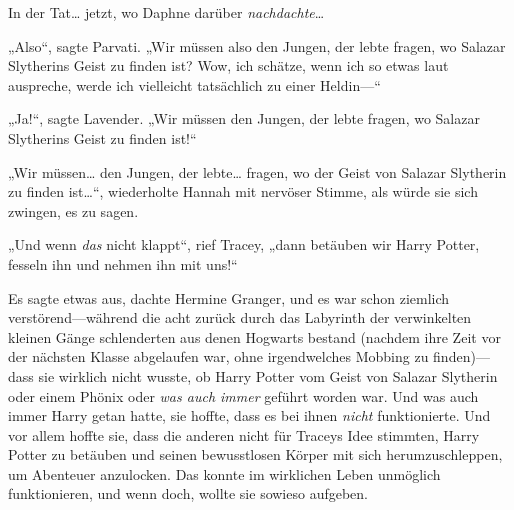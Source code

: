 In der Tat… jetzt, wo Daphne darüber \emph{nachdachte}…

„Also“, sagte Parvati. „Wir müssen also den Jungen, der lebte fragen, wo Salazar Slytherins Geist zu finden ist? Wow, ich schätze, wenn ich so etwas laut auspreche, werde ich vielleicht tatsächlich zu einer Heldin—“

„Ja!“, sagte Lavender. „Wir müssen den Jungen, der lebte fragen, wo Salazar Slytherins Geist zu finden ist!“

„Wir müssen… den Jungen, der lebte… fragen, wo der Geist von Salazar Slytherin zu finden ist…“, wiederholte Hannah mit nervöser Stimme, als würde sie sich zwingen, es zu sagen.

„Und wenn \emph{das} nicht klappt“, rief Tracey, „dann betäuben wir Harry Potter, fesseln ihn und nehmen ihn mit uns!“

\later

Es sagte etwas aus, dachte Hermine Granger, und es war schon ziemlich verstörend—während die acht zurück durch das Labyrinth der verwinkelten kleinen Gänge schlenderten aus denen Hogwarts bestand (nachdem ihre Zeit vor der nächsten Klasse abgelaufen war, ohne irgendwelches Mobbing zu finden)—dass sie wirklich nicht wusste, ob Harry Potter vom Geist von Salazar Slytherin oder einem Phönix oder \emph{was auch immer} geführt worden war. Und was auch immer Harry getan hatte, sie hoffte, dass es bei ihnen \emph{nicht} funktionierte. Und vor allem hoffte sie, dass die anderen nicht für Traceys Idee stimmten, Harry Potter zu betäuben und seinen bewusstlosen Körper mit sich herumzuschleppen, um Abenteuer anzulocken. Das konnte im wirklichen Leben unmöglich funktionieren, und wenn doch, wollte sie sowieso aufgeben.

